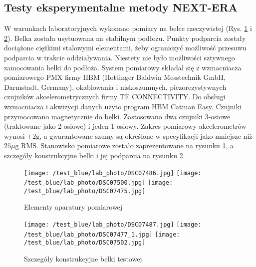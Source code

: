 \pagebreak
{}
\subsection{Testy eksperymentalne metody NEXT-ERA} \label{sect: next_era_lab_test}
W warunkach laboratoryjnych wykonano pomiary na belce rzeczywistej (Rys. \ref{fig: blue_beam_lab_photo_a} i \ref{fig: blue_beam_lab_photo_b}). Belka została usytuowana na stabilnym podłożu. Punkty podparcia zostały dociążone ciężkimi stalowymi elementami, żeby ograniczyć możliwość przesuwu podparcia w trakcie oddziaływania. Niestety nie było możliwości sztywnego zamocowania belki do podłoża. System pomiarowy składał się z wzmacniacza pomiarowego PMX firmy HBM (Hottinger Baldwin Messtechnik GmbH, Darmstadt, Germany), okablowania i niskoszumnych, piezorezystywnych czujników akcelerometrycznych firmy TE CONNECTIVITY. Do obsługi wzmacniacza i akwizycji danych użyto program HBM Catman Easy. Czujniki przymocowano magnetycznie do belki. Zastosowano dwa czujniki 3-osiowe (traktowane jako 2-osiowe) i jeden 1-osiowy. Zakres pomiarowy akcelerometrów wynosi $\pm 2 \text{g}$, a gwarantowane szumy są określone w specyfikacji jako mniejsze niż $25 \mu \text{g RMS}$.  Stanowisko pomiarowe zostało zaprezentowane na rysunku \ref{fig: blue_beam_lab_photo_a}, a szczegóły konstrukcyjne belki i jej podparcia na rysunku \ref{fig: blue_beam_lab_photo_b}.
\begin{figure}[hbt!]
	\centering	
	\texttt{[image: /test\_blue/lab\_photo/DSC07486.jpg]}
	\texttt{[image: /test\_blue/lab\_photo/DSC07500.jpg]}
	\texttt{[image: /test\_blue/lab\_photo/DSC07475.jpg]}
	\captionsetup{justification=centering}
	\caption{Elementy aparatury pomiarowej}
	\label{fig: blue_beam_lab_photo_a}
\end{figure}
\begin{figure}[hbt!]
	\centering
	\texttt{[image: /test\_blue/lab\_photo/DSC07487.jpg]}
	\texttt{[image: /test\_blue/lab\_photo/DSC07477\_1.jpg]}
	\texttt{[image: /test\_blue/lab\_photo/DSC07502.jpg]}
	\captionsetup{justification=centering}
	\caption{Szczegóły konstrukcyjne belki testowej}
	\label{fig: blue_beam_lab_photo_b}
\end{figure}




